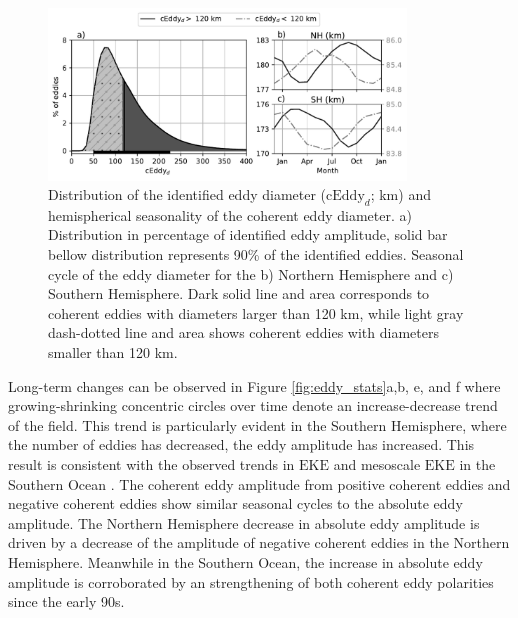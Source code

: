 \documentclass[draft,linenumbers]{agujournal2019}
\newcommand{\EKE}{\textrm{EKE}}
\newcommand{\cEddy}{\textrm{cEddy}}
\begin{document}
	\begin{figure}
	    \centering
	    \includegraphics[width=95mm]{figures/eddy_diameter_seasonal.pdf}
	    \caption{Distribution of the identified eddy diameter ($\cEddy_d$; km) and hemispherical seasonality of the coherent eddy diameter. a) Distribution in percentage of identified eddy amplitude, solid bar bellow distribution represents 90\% of the identified eddies. Seasonal cycle of the eddy diameter for the b) Northern Hemisphere and c) Southern Hemisphere. Dark solid line and area corresponds to coherent eddies with diameters larger than 120 km, while light gray dash-dotted line and area shows coherent eddies with diameters smaller than 120 km.}
	    \label{fig:eddy_diameter}
	\end{figure}


	Long-term changes can be observed in Figure \ref{fig:eddy_stats}a,b, e, and f where growing-shrinking concentric circles over time denote an increase-decrease trend of the field. 
	This trend is particularly evident in the Southern Hemisphere, where the number of eddies has decreased, the eddy amplitude has increased. 
	This result is consistent with the observed trends in $\EKE$ and mesoscale $\EKE$ in the Southern Ocean \citep{Hogg_Recent_2015,Martinez_TKE_2019}. 
	The coherent eddy amplitude from positive coherent eddies and negative coherent eddies show similar seasonal cycles to the absolute eddy amplitude.
	The Northern Hemisphere decrease in absolute eddy amplitude is driven by a decrease of the amplitude of negative coherent eddies in the Northern Hemisphere. 
	Meanwhile in the Southern Ocean, the increase in absolute eddy amplitude is corroborated by an strengthening of both coherent eddy polarities since the early 90s.

\end{document}
